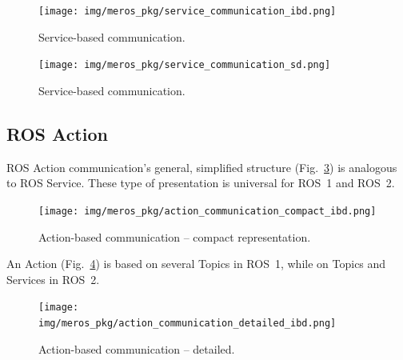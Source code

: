 \documentclass[11pt,oneside,a4paper]{report}
\begin{document}
	\begin{figure}[H]
		\centering
		\begin{center}
			{\texttt{[image: img/meros\_pkg/service\_communication\_ibd.png]}}
		\end{center}
		\caption{Service-based communication.} 
		\label{fig:service_communication_ibd}
	\end{figure}
	

	\begin{figure}[H]
		\centering
		\begin{center}
			{\texttt{[image: img/meros\_pkg/service\_communication\_sd.png]}}
		\end{center}
		\caption{Service-based communication.} 
		\label{fig:service_communication_sd}
	\end{figure}
	
	
\subsection{ROS Action}
\label{ch:metamodel-action}
	
	ROS Action communication's general, simplified structure (Fig.~\ref{fig:action_communication_compact_ibd}) is analogous to ROS Service. These type of presentation is universal for ROS~1 and ROS~2.
	

	\begin{figure}[H]
		\centering
		\begin{center}
			{\texttt{[image: img/meros\_pkg/action\_communication\_compact\_ibd.png]}}
		\end{center}
		\caption{Action-based communication -- compact representation.} 
		\label{fig:action_communication_compact_ibd}
	\end{figure}
	
	
	 An Action (Fig.~\ref{fig:action_communication_detailed_ibd}) is based on several Topics in ROS~1, while on Topics and Services in ROS~2.
	

	\begin{figure}[H]
		\centering
		\begin{center}
			{\texttt{[image: img/meros\_pkg/action\_communication\_detailed\_ibd.png]}}
		\end{center}
		\caption{Action-based communication -- detailed.} 
		\label{fig:action_communication_detailed_ibd}
	\end{figure}
	
\end{document}
